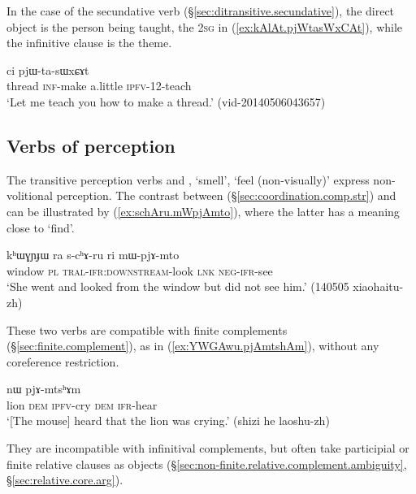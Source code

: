 In the case of the secundative verb  (§\ref{sec:ditransitive.secundative}), the direct object is the person being taught, the \textsc{2sg} in (\ref{ex:kAlAt.pjWtasWxCAt}), while the infinitive clause is the theme.

\begin{exe}
\ex \label{ex:kAlAt.pjWtasWxCAt}
  ci pjɯ-ta-sɯxɕɤt \\
 thread \textsc{inf}-make a.little \textsc{ipfv}-1\fl{}2-teach \\
 \glt `Let me teach you how to make a thread.' (vid-20140506043657)
  \end{exe}
  
 \subsection{Verbs of perception}   \label{sec:mto.mtshAm.complement}
    
The transitive perception verbs  and , `smell', `feel (non-visually)' express non-volitional perception. The contrast between  (§\ref{sec:coordination.comp.str}) and  can be illustrated by (\ref{ex:schAru.mWpjAmto}), where the latter has a meaning close to `find'.

\begin{exe}
\ex \label{ex:schAru.mWpjAmto}
 \gll kʰɯɣɲɟɯ ra s-cʰɤ-ru ri mɯ-pjɤ-mto \\
 window \textsc{pl} \textsc{tral}-\textsc{ifr}:\textsc{downstream}-look \textsc{lnk} \textsc{neg}-\textsc{ifr}-see \\
 \glt `She went and looked from the window but did not see him.' (140505 xiaohaitu-zh)
\end{exe}

These two verbs are compatible with finite complements (§\ref{sec:finite.complement}), as in (\ref{ex:YWGAwu.pjAmtshAm}), without any coreference restriction. 

\begin{exe}
\ex \label{ex:YWGAwu.pjAmtshAm}
  nɯ pjɤ-mtsʰɤm \\
 lion \textsc{dem} \textsc{ipfv}-cry \textsc{dem} \textsc{ifr}-hear \\
 \glt `[The mouse] heard that the lion was crying.' (shizi he laoshu-zh)
\end{exe}

They are incompatible with infinitival complements, but often take participial or finite relative clauses as objects (§\ref{sec:non-finite.relative.complement.ambiguity}, §\ref{sec:relative.core.arg}). 

